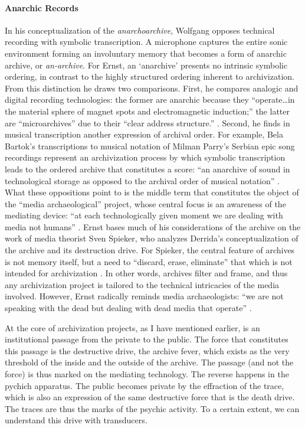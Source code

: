 
\paragraph{Anarchic Records}
In his conceptualization of the \textit{anarchoarchive}, Wolfgang \textcite{Ern13:Dig} opposes technical recording with symbolic transcription. A microphone captures the entire sonic environment forming an involuntary memory that becomes a form of anarchic archive, or \textit{an-archive}. For Ernst, an `anarchive' presents no intrinsic symbolic ordering, in contrast to the highly structured ordering inherent to archivization. From this distinction he draws two comparisons. First, he compares analogic and digital recording technologies: the former are anarchic because they ``operate\dots in the material sphere of magnet spots and electromagnetic induction;'' the latter are ``microarchives'' due to their ``clear address structure.'' \textcite[92]{Ern13:Dig}. Second, he finds in musical transcription another expression of archival order. For example, Bela Bartok's transcriptions to musical notation of Milman Parry's Serbian epic song recordings represent an archivization process by which symbolic transcription leads to the ordered archive that constitutes a score: ``an anarchive of sound in technological storage as opposed to the archival order of musical notation'' \parencite[174]{Ern13:Dig}. What these oppositions point to is the middle term that constitutes the object of the ``media archaeological'' project, whose central focus is an awareness of the mediating device: ``at each technologically given moment we are dealing with media not humans'' \parencite[183]{Ern13:Dig}. Ernst bases much of his considerations of the archive on the work of media theorist Sven Spieker, who analyzes Derrida's conceptualization of the archive and its destruction drive. For Spieker, the central feature of archives is not memory itself, but a need to ``discard, erase, eliminate'' that which is not intended for archivization \parencite[113]{Ern13:Dig}. In other words, archives filter and frame, and thus any archivization project is tailored to the technical intricacies of the media involved. However, Ernst radically reminds media archaeologists: ``we are not speaking with the dead but dealing with dead media that operate'' \parencite[183]{Ern13:Dig}.   

At the core of archivization projects, as I have mentioned earlier, is an institutional passage from the private to the public. The force that constitutes this passage is the destructive drive, the archive fever, which exists as the very threshold of the inside and the outside of the archive. The passage (and not the force) is thus marked on the mediating technology. The reverse happens in the pychich apparatus. The public becomes private by the effraction of the trace, which is also an expression of the same destructive force that is the death drive. The traces are thus the marks of the psychic activity. To a certain extent, we can understand this drive with transducers.

